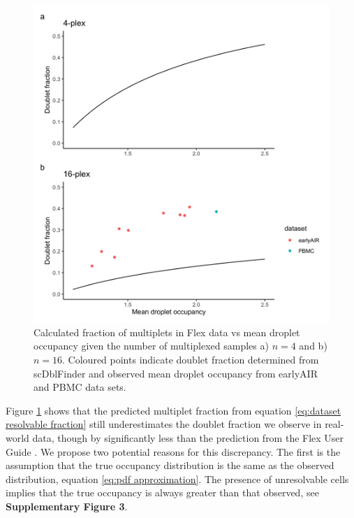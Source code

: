 \documentclass[unnumsec,webpdf,modern,large]{oup-authoring-template}
\begin{document}
	\begin{figure}
		\begin{center}
			\includegraphics[scale=0.1]{figures/observable_fraction.png}	
			\caption{Calculated fraction of multiplets in Flex data vs mean droplet occupancy given the number of multiplexed samples a) $n = 4$ and b) $n = 16$.
			Coloured points indicate doublet fraction determined from scDblFinder and observed mean droplet occupancy from earlyAIR and PBMC data sets.
			}		
			\label{fig: resolvable fraction observed}
		\end{center}
	\end{figure}
	Figure \ref{fig: resolvable fraction observed} shows that the predicted multiplet fraction from equation \eqref{eq:dataset resolvable fraction} still underestimates the doublet fraction we observe in real-world data, though by significantly less than the prediction from the Flex User Guide 
	\citep{10X_flex_protocol}. 
	We propose two potential reasons for this discrepancy. 
	The first is the assumption that the true occupancy distribution is the same as the observed distribution, equation \ref{eq:pdf approximation}.
	The presence of unresolvable cells implies that the true occupancy is always greater than that observed, see \textbf{Supplementary Figure 3}.
\end{document}
